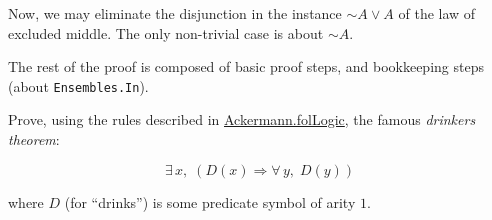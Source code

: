 Now, we may eliminate the disjunction 
in the instance $\sim A \vee A$ of the law of excluded middle.
The only non-trivial case is about $\sim A$.


The rest of the proof is composed of basic proof steps, 
and bookkeeping steps (about \texttt{Ensembles.In}).


\begin{exercise}
Prove, using the rules described in 
 \href{../theories/html/hydras.Ackermann.folLogic.html}{Ackermann.folLogic}, the famous \emph{drinkers theorem}:

$$\exists\,x,\; (D(x)\Longrightarrow \forall\,y,\; D(y))$$
\end{exercise}

where $D$ (for ``drinks'') is some predicate symbol of arity $1$.


